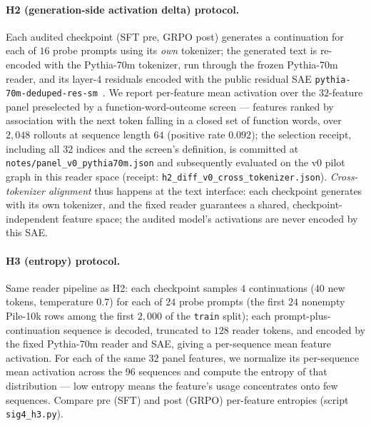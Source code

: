 \documentclass{article}
\begin{document}
\paragraph{H2 (generation-side activation delta) protocol.}
Each audited checkpoint (SFT pre, GRPO post) generates a continuation for each of $16$ probe prompts using its \emph{own} tokenizer; the generated text is re-encoded with the Pythia-70m tokenizer, run through the frozen Pythia-70m reader, and its layer-4 residuals encoded with the public residual SAE \texttt{pythia-70m-deduped-res-sm}~\citep{marks2024sparse_circuits}. We report per-feature mean activation over the $32$-feature panel preselected by a function-word-outcome screen --- features ranked by association with the next token falling in a closed set of function words, over $2{,}048$ rollouts at sequence length $64$ (positive rate $0.092$); the selection receipt, including all $32$ indices and the screen's definition, is committed at \texttt{notes/panel\_v0\_pythia70m.json} and subsequently evaluated on the v0 pilot graph in this reader space (receipt: \texttt{h2\_diff\_v0\_cross\_tokenizer.json}). \emph{Cross-tokenizer alignment} thus happens at the text interface: each checkpoint generates with its own tokenizer, and the fixed reader guarantees a shared, checkpoint-independent feature space; the audited model's activations are never encoded by this SAE.

\paragraph{H3 (entropy) protocol.}
Same reader pipeline as H2: each checkpoint samples $4$ continuations ($40$ new tokens, temperature $0.7$) for each of $24$ probe prompts (the first $24$ nonempty Pile-10k rows among the first $2{,}000$ of the \texttt{train} split); each prompt-plus-continuation sequence is decoded, truncated to $128$ reader tokens, and encoded by the fixed Pythia-70m reader and SAE, giving a per-sequence mean feature activation. For each of the same $32$ panel features, we normalize its per-sequence mean activation across the $96$ sequences and compute the entropy of that distribution --- low entropy means the feature's usage concentrates onto few sequences. Compare pre (SFT) and post (GRPO) per-feature entropies (script \texttt{sig4\_h3.py}).
\end{document}
